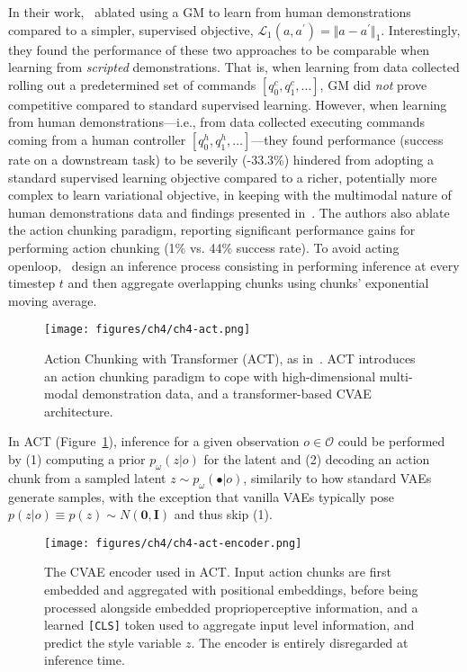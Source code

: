 In their work,~\citet{zhaoLearningFineGrainedBimanual2023} ablated using a GM to learn from human demonstrations compared to a simpler, supervised objective, \( \mathcal L_1(a,a^\prime) = \Vert a - a^\prime \Vert_1 \).
Interestingly, they found the performance of these two approaches to be comparable when learning from \emph{scripted} demonstrations.
That is, when learning from data collected rolling out a predetermined set of commands \( [q^c_0, q^c_1, \dots] \), GM did \emph{not} prove competitive compared to standard supervised learning.
However, when learning from human demonstrations---i.e., from data collected executing commands coming from a human controller \( [q^h_0, q^h_1, \dots] \)---they found performance (success rate on a downstream task) to be severily (-33.3\%) hindered from adopting a standard supervised learning objective compared to a richer, potentially more complex to learn variational objective, in keeping with the multimodal nature of human demonstrations data and findings presented in~\citet{florenceImplicitBehavioralCloning2022}.
The authors also ablate the action chunking paradigm, reporting significant performance gains for performing action chunking (1\% vs. 44\% success rate).
To avoid acting openloop,~\citet{zhaoLearningFineGrainedBimanual2023} design an inference process consisting in performing inference at every timestep \( t \) and then aggregate overlapping chunks using chunks' exponential moving average.

\begin{figure}
    \centering
    \texttt{[image: figures/ch4/ch4-act.png]}
    \caption{Action Chunking with Transformer (ACT), as in~\citet{zhaoLearningFineGrainedBimanual2023}. ACT introduces an action chunking paradigm to cope with high-dimensional multi-modal demonstration data, and a transformer-based CVAE architecture.}
    \label{fig:ch4-act}
\end{figure}

In ACT (Figure~\ref{fig:ch4-act}), inference for a given observation \( o \in \mathcal O \) could be performed by (1) computing a prior \( p_\omega(z \vert o) \) for the latent and (2) decoding an action chunk from a sampled latent \( z \sim p_\omega(\bullet \vert o) \), similarily to how standard VAEs generate samples, with the exception that vanilla VAEs typically pose \( p(z\vert o) \equiv p(z) \sim N(\mathbf{0}, \mathbf{I}) \) and thus skip (1).

\begin{figure}
    \centering
    \texttt{[image: figures/ch4/ch4-act-encoder.png]}
    \caption{The CVAE encoder used in ACT. Input action chunks are first embedded and aggregated with positional embeddings, before being processed alongside embedded proprioperceptive information, and a learned \texttt{[CLS]} token used to aggregate input level information, and predict the style variable \( z \). The encoder is entirely disregarded at inference time.}
    \label{fig:ch4-act-encoder}
\end{figure}

